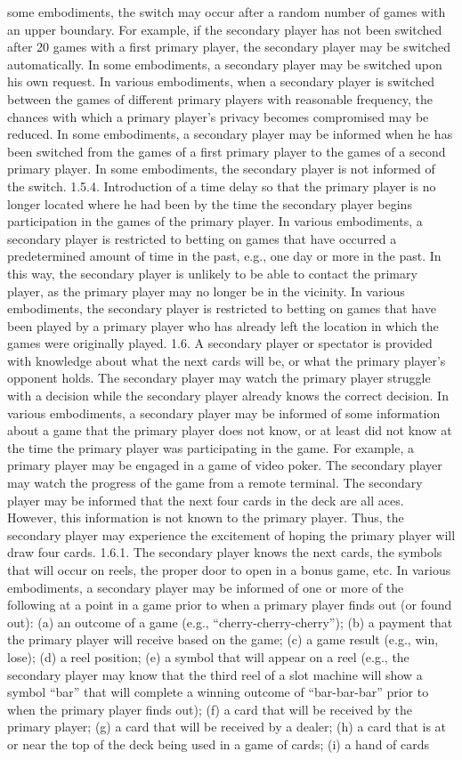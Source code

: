 \documentclass[11pt,a4paper]{article}
\begin{document}
some embodiments, the switch may occur after a random number of games with an upper boundary. For example, if the secondary player has not been switched after 20 games with a first primary player, the secondary player may be switched automatically. In some embodiments, a secondary player may be switched upon his own request. In various embodiments, when a secondary player is switched between the games of different primary players with reasonable frequency, the chances with which a primary player's privacy becomes compromised may be reduced. In some embodiments, a secondary player may be informed when he has been switched from the games of a first primary player to the games of a second primary player. In some embodiments, the secondary player is not informed of the switch. 1.5.4. Introduction of a time delay so that the primary player is no longer located where he had been by the time the secondary player begins participation in the games of the primary player. In various embodiments, a secondary player is restricted to betting on games that have occurred a predetermined amount of time in the past, e.g., one day or more in the past. In this way, the secondary player is unlikely to be able to contact the primary player, as the primary player may no longer be in the vicinity. In various embodiments, the secondary player is restricted to betting on games that have been played by a primary player who has already left the location in which the games were originally played. 1.6. A secondary player or spectator is provided with knowledge about what the next cards will be, or what the primary player's opponent holds. The secondary player may watch the primary player struggle with a decision while the secondary player already knows the correct decision. In various embodiments, a secondary player may be informed of some information about a game that the primary player does not know, or at least did not know at the time the primary player was participating in the game. For example, a primary player may be engaged in a game of video poker. The secondary player may watch the progress of the game from a remote terminal. The secondary player may be informed that the next four cards in the deck are all aces. However, this information is not known to the primary player. Thus, the secondary player may experience the excitement of hoping the primary player will draw four cards. 1.6.1. The secondary player knows the next cards, the symbols that will occur on reels, the proper door to open in a bonus game, etc. In various embodiments, a secondary player may be informed of one or more of the following at a point in a game prior to when a primary player finds out (or found out): (a) an outcome of a game (e.g., “cherry-cherry-cherry”); (b) a payment that the primary player will receive based on the game; (c) a game result (e.g., win, lose); (d) a reel position; (e) a symbol that will appear on a reel (e.g., the secondary player may know that the third reel of a slot machine will show a symbol “bar” that will complete a winning outcome of “bar-bar-bar” prior to when the primary player finds out); (f) a card that will be received by the primary player; (g) a card that will be received by a dealer; (h) a card that is at or near the top of the deck being used in a game of cards; (i) a hand of cards 
\end{document}
